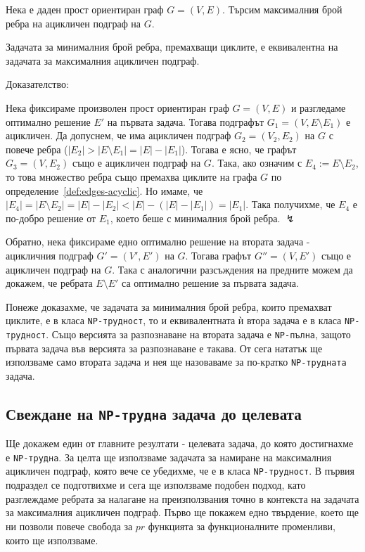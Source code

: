 \documentclass[12pt,twoside,a4paper]{article}
\begin{document}
	\begin{problem} Нека е даден прост ориентиран граф $G=(V,E)$. Търсим максималния брой ребра на ацикличен подграф на $G$.
	\end{problem}
	
	\begin{statement}
		Задачата за минималния брой ребра, премахващи циклите, е еквивалентна на задачата за максималния ацикличен подграф.
		
		\noindent Доказателство:
		
		Нека фиксираме произволен прост ориентиран граф $G=(V,E)$ и разгледаме оптимално решение $E'$ на първата задача. Тогава подграфът $G_1=(V,E \setminus E_1)$ е ацикличен. Да допуснем, че има ацикличен подграф $G_2=(V_2,E_2)$ на $G$ с повече ребра ($|E_2| > |E \setminus E_1| = |E| - |E_1|$). Тогава е ясно, че графът $G_3=(V,E_2)$ също е ацикличен подграф на $G$. Така, ако означим с $E_4 := E \setminus E_2$, то това множество ребра също премахва циклите на графа $G$ по определение~\ref{def:edges-acyclic}. Но имаме, че $|E_4| = |E \setminus E_2| = |E| - |E_2| < |E| - (|E| - |E_1|) = |E_1|$. Така получихме, че $E_4$ е по-добро решение от $E_1$, което беше с минималния брой ребра. $\lightning$
		
		Обратно, нека фиксираме едно оптимално решение на втората задача - ацикличния подграф $G'=(V',E')$ на $G$. Тогава графът $G''=(V,E')$ също е ацикличен подграф на $G$. Така с аналогични разсъждения на предните можем да докажем, че ребрата $E \setminus E'$ са оптимално решение за първата задача.
	\end{statement}
	
	Понеже доказахме, че задачата за минималния брой ребра, които премахват циклите, е в класа \texttt{NP-трудност}, то и еквивалентната ѝ втора задача е в класа \texttt{NP-трудност}. Също версията за разпознаване на втората задача е \texttt{NP-пълна}, защото първата задача във версията за разпознаване е такава. От сега нататък ще използваме само втората задача и нея ще назоваваме за по-кратко \texttt{NP-трудната} задача.
	
	\subsection{Свеждане на \texttt{NP-трудна} задача до целевата}
	
	Ще докажем един от главните резултати - целевата задача, до която достигнахме е \texttt{NP-трудна}. За целта ще използваме задачата за намиране на максималния ацикличен подграф, която вече се убедихме, че е в класа \texttt{NP-трудност}. В първия подраздел се подготвихме и сега ще използваме подобен подход, като разглеждаме ребрата за налагане на преизползвания точно в контекста на задачата за максималния ацикличен подграф. Първо ще покажем едно твърдение, което ще ни позволи повече свобода за $pr$ функцията за функционалните променливи, които ще използваме.
	
\end{document}
